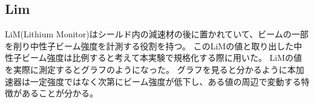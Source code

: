 \subsection{Lim}
LiM(Lithium Monitor)はシールド内の減速材の後に置かれていて、ビームの一部を削り中性子ビーム強度を計測する役割を持つ。
このLiMの値と取り出した中性子ビーム強度は比例すると考えて本実験で規格化する際に用いた。
LiMの値を実際に測定するとグラフのようになった。
グラフを見ると分かるように本加速器は一定強度ではなく次第にビーム強度が低下し、ある値の周辺で変動する特徴があることが分かる。